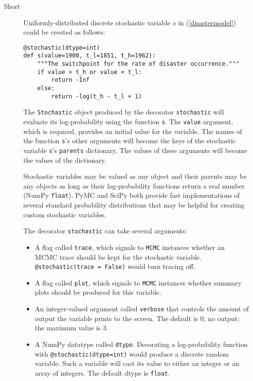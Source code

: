 \begin{description}
    
    \item[Short] Uniformly-distributed discrete stochastic variable $s$ in (\ref{disastermodel}) could be created as follows:
    \begin{verbatim}
@stochastic(dtype=int)
def s(value=1900, t_l=1851, t_h=1962):
    """The switchpoint for the rate of disaster occurrence."""
    if value > t_h or value < t_l:
        return -Inf
    else:
        return -log(t_h - t_l + 1) 
    \end{verbatim}
    The \texttt{Stochastic} object produced by the decorator \texttt{stochastic} will evaluate its log-probability using the function \texttt{s}. The \texttt{value} argument, which is required, provides an initial value for the variable. The names of the function \texttt{s}'s other arguments will become the keys of the stochastic variable \texttt{s}'s \texttt{parents} dictionary. The values of these arguments will become the values of the dictionary.

Stochastic variables may be valued as any object and their parents may be any objects as long as their log-probability functions return a real number (NumPy \texttt{float}). PyMC and SciPy both provide fast implementations of several standard probability distributions that may be helpful for creating custom stochastic variables.

    The decorator \texttt{stochastic} can take several arguments: 
    \begin{itemize}
        \item A flag called \texttt{trace}, which signals to \texttt{MCMC} instances whether an MCMC trace should be kept for the stochastic variable. \texttt{@stochastic(trace = False)} would turn tracing off.
        \item A flag called \texttt{plot}, which signals to \texttt{MCMC} instances whether summary plots should be produced for this variable.
        \item An integer-valued argument called \texttt{verbose} that controls the amount of output the variable prints to the screen. The default is $0$, no output; the maximum value is 3. 
        \item A NumPy datatype called \texttt{dtype}. Decorating a log-probability function with \texttt{@stochastic(dtype=int)} would produce a discrete random variable. Such a variable will cast its value to either an integer or an array of integers. The default dtype is \texttt{float}.
    \end{itemize} 
    


\end{description}
